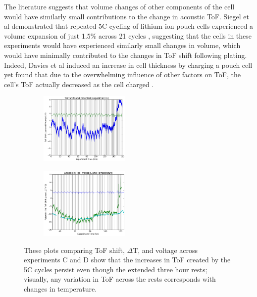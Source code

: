 The literature suggests that volume changes of other components of the cell would have similarly small contributions to the change in acoustic ToF. Siegel et al demonstrated that repeated 5C cycling of lithium ion pouch cells experienced a volume expansion of just 1.5\% across 21 cycles \cite{EXPANSION}, suggesting that the cells in these experiments would have experienced similarly small changes in volume, which would have minimally contributed to the changes in ToF shift following plating. Indeed, Davies et al induced an increase in cell thickness by charging a pouch cell yet found that due to the overwhelming influence of other factors on ToF, the cell's ToF actually decreased as the cell charged \cite{SOC-SOH-EST}.

\begin{figure}[h!]\label{fig:rest}
\centering
     \begin{subfigure}
         \centering
         \includegraphics[width=0.48\textwidth]{Thesis/0409rest.png}
     \end{subfigure}
     \hfill
     \begin{subfigure}
         \centering
         \includegraphics[width=0.48\textwidth]{Thesis/0417rest.png}
     \end{subfigure}
     \caption{These plots comparing ToF shift, $\Delta$T, and voltage across experiments C and D show that the increases in ToF created by the 5C cycles persist even though the extended three hour rests; visually, any variation in ToF across the rests corresponds with changes in temperature.}
\end{figure}

